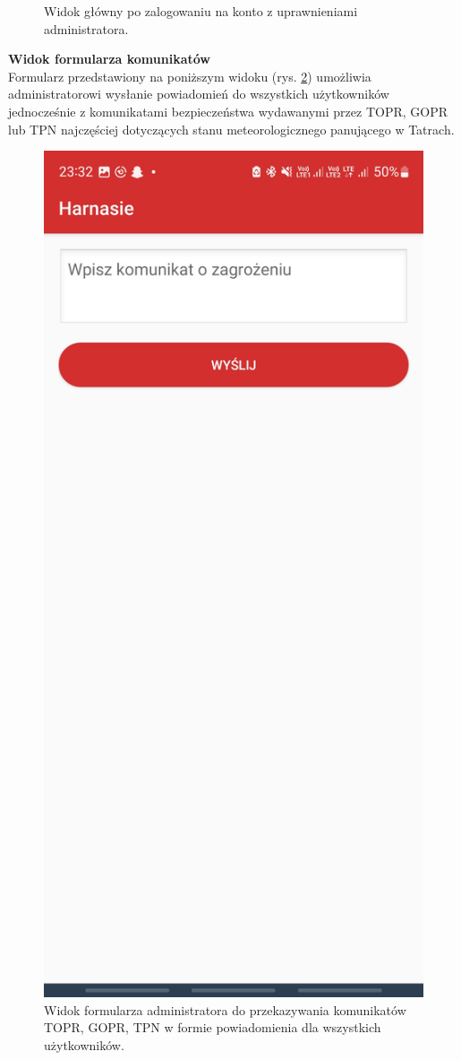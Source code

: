 \begin{figure}[H]
    \caption{Widok główny po zalogowaniu na konto z uprawnieniami administratora.}
    \label{widok:adminhome}
\end{figure}

\textbf{Widok formularza komunikatów}\\
\indent Formularz przedstawiony na poniższym widoku (rys. \ref{widok:admindanger}) umożliwia administratorowi wysłanie powiadomień do wszystkich użytkowników jednocześnie z komunikatami bezpieczeństwa wydawanymi przez TOPR, GOPR lub TPN najczęściej dotyczących stanu meteorologicznego panującego w Tatrach.
\begin{figure}[H]
    \centering
    \includegraphics[scale=0.15]{img/imp/widok-admin-danger.jpg}
    \caption{Widok formularza administratora do przekazywania komunikatów TOPR, GOPR, TPN w formie powiadomienia dla wszystkich użytkowników.}
    \label{widok:admindanger}
\end{figure}
